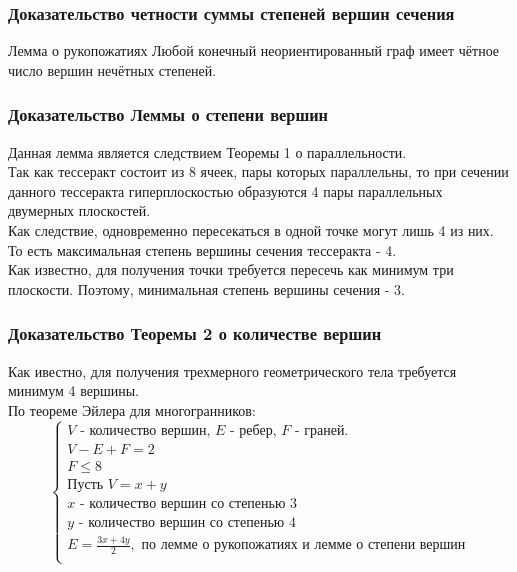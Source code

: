 \documentclass[10pt,pdf,hyperref={unicode}]{beamer}
\begin{document}
\begin{frame}
	\frametitle{Доказательство четности суммы степеней вершин сечения}
	\begin{block}{Лемма о рукопожатиях}
		Любой конечный неориентированный граф имеет чётное число вершин нечётных степеней.
	\end{block}
\end{frame}
\begin{frame}
	\frametitle{Доказательство Леммы о степени вершин}
	Данная лемма является следствием Теоремы 1 о параллельности. \\
	Так как тессеракт состоит из 8 ячеек, пары которых параллельны, то при сечении данного тессеракта гиперплоскостью образуются 4 пары параллельных двумерных плоскостей. \\
	Как следствие, одновременно пересекаться в одной точке могут лишь 4 из них. То есть максимальная степень вершины сечения тессеракта - 4. \\
	Как известно, для получения точки требуется пересечь как минимум три плоскости. Поэтому, минимальная степень вершины сечения - 3.
\end{frame}
\begin{frame}
	\frametitle{Доказательство Теоремы 2 о количестве вершин}
	Как ивестно, для получения трехмерного геометрического тела требуется минимум 4 вершины. \\
	По теореме Эйлера для многогранников: 
	\begin{equation*}
	\left\{
		\begin{array}{lc}
		\mbox{$V$ - количество вершин, $E$ - ребер, $F$ - граней.} \\
		V-E+F=2 \\
		F\le8 \\
		\mbox{Пусть }V=x+y \\
		\mbox{$x$ - количество вершин со степенью 3}\\ 
		\mbox{$y$ - количество вершин со степенью 4} \\
		E=\frac{3x+4y}{2}, 
		\mbox{ по лемме о рукопожатиях и лемме о степени вершин}\\
	\end{array}
\end{equation*}
\end{frame}
\end{document}
